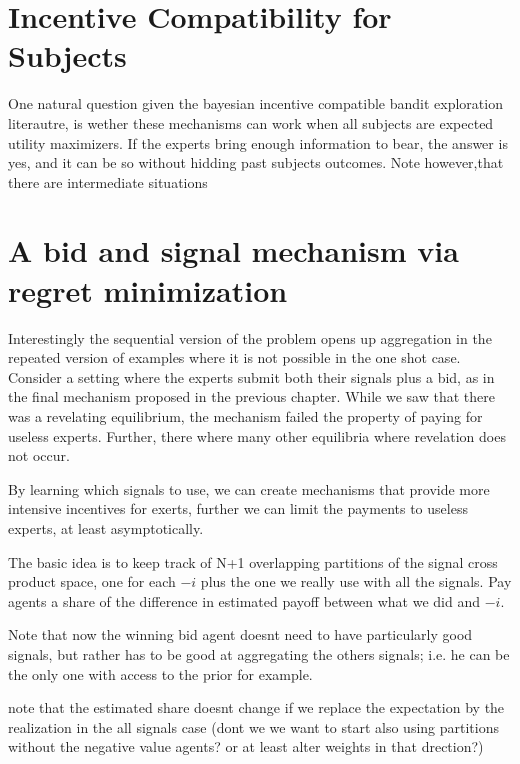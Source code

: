 \section{Incentive Compatibility for Subjects}

One natural question given the bayesian incentive compatible bandit exploration literautre, is wether these mechanisms can work when all subjects are expected utility maximizers. If the experts bring enough information to bear, the answer is yes, and it can be so without hidding past subjects outcomes. Note however,that there are intermediate situations 



\section{A bid and signal mechanism via regret minimization}

Interestingly the sequential version of the problem opens up aggregation in the repeated version of examples where it is not possible in the one shot case. Consider a setting where the experts submit both their signals plus a bid, as in the final mechanism proposed in the previous chapter. While we saw that there was a revelating equilibrium, the mechanism failed the property of paying for useless experts. Further, there where many other equilibria where revelation does not occur. 

By learning which signals to use, we can create mechanisms that provide more intensive incentives for exerts, further we can limit the payments to useless experts, at least asymptotically. 


The basic idea is to keep track of N+1 overlapping partitions of the signal cross product space, one for each $-i$ plus the one we really use with all the signals. Pay agents a share of the difference in estimated payoff between what we did and $-i$.

Note that now the winning bid agent doesnt need to have particularly good signals, but rather has to be good at aggregating the others signals; i.e. he can be the only one with access to the prior for example.


note that the estimated share doesnt change if we replace the expectation by the realization in the all signals case (dont we we want to start also using partitions without the negative value agents? or at least alter weights in that drection?)

